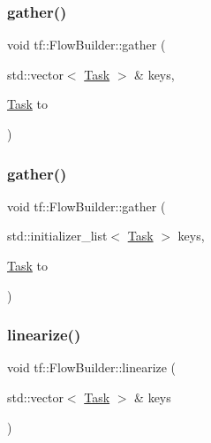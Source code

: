 \mbox{\label{classtf_1_1FlowBuilder_a6f68be7b9cf49770abbbc2b1fcb4d461}} 
\subsubsection{\texorpdfstring{gather()}{gather()}\hspace{0.1cm}{\footnotesize\ttfamily [1/2]}}
{\footnotesize\ttfamily void tf\+::\+Flow\+Builder\+::gather (\begin{DoxyParamCaption}\item[{std\+::vector$<$ \hyperlink{classtf_1_1Task}{Task} $>$ \&}]{keys,  }\item[{\hyperlink{classtf_1_1Task}{Task}}]{to }\end{DoxyParamCaption})\hspace{0.3cm}{\ttfamily [inline]}}

\mbox{\label{classtf_1_1FlowBuilder_a96c59ed5cdab83efd7e4a42f81241e69}} 
\subsubsection{\texorpdfstring{gather()}{gather()}\hspace{0.1cm}{\footnotesize\ttfamily [2/2]}}
{\footnotesize\ttfamily void tf\+::\+Flow\+Builder\+::gather (\begin{DoxyParamCaption}\item[{std\+::initializer\+\_\+list$<$ \hyperlink{classtf_1_1Task}{Task} $>$}]{keys,  }\item[{\hyperlink{classtf_1_1Task}{Task}}]{to }\end{DoxyParamCaption})\hspace{0.3cm}{\ttfamily [inline]}}

\mbox{\label{classtf_1_1FlowBuilder_a830e6242588432bac68c4430ae5912f6}} 
\subsubsection{\texorpdfstring{linearize()}{linearize()}\hspace{0.1cm}{\footnotesize\ttfamily [1/2]}}
{\footnotesize\ttfamily void tf\+::\+Flow\+Builder\+::linearize (\begin{DoxyParamCaption}\item[{std\+::vector$<$ \hyperlink{classtf_1_1Task}{Task} $>$ \&}]{keys }\end{DoxyParamCaption})\hspace{0.3cm}{\ttfamily [inline]}}

